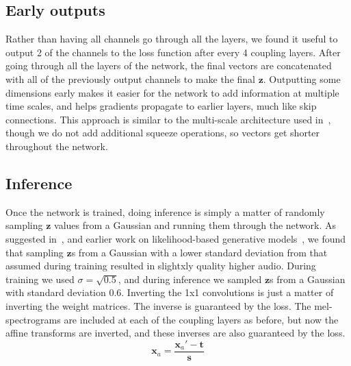 \subsection{Early outputs}
Rather than having all channels go through all the layers, we found it useful to output 2 of the channels to the loss function after every 4 coupling layers.  After going through all the layers of the network, the final vectors are concatenated with all of the previously output channels to make the final $\boldsymbol{z}$.  Outputting some dimensions early makes it easier for the network to add information at multiple time scales, and helps gradients propagate to earlier layers, much like skip connections.  This approach is similar to the multi-scale architecture used in~\cite{kingma2018glow,dinh2016density}, though we do not add additional squeeze operations, so vectors get shorter throughout the network.  

\subsection{Inference}
Once the network is trained, doing inference is simply a matter of randomly sampling $\boldsymbol{z}$ values from a Gaussian and running them through the network. As suggested in~\cite{kingma2018glow}, and earlier work on likelihood-based generative models~\cite{parmar2018image}, we found that sampling $\boldsymbol{z}$s from a Gaussian with a lower standard deviation from that assumed during training resulted in slightxly quality higher audio. During training we used $\sigma=\sqrt{0.5}$, and during inference we sampled $\boldsymbol{z}$s from a Gaussian with standard deviation 0.6.  Inverting the 1x1 convolutions is just a matter of inverting the weight matrices.  The inverse is guaranteed by the loss.  The mel-spectrograms are included at each of the coupling layers as before, but now the affine transforms are inverted, and these inverses are also guaranteed by the loss.
\begin{equation}
\boldsymbol{x}_a = \frac{\boldsymbol{x}_a\prime - \boldsymbol{t}}{\boldsymbol{s}}
\end{equation}